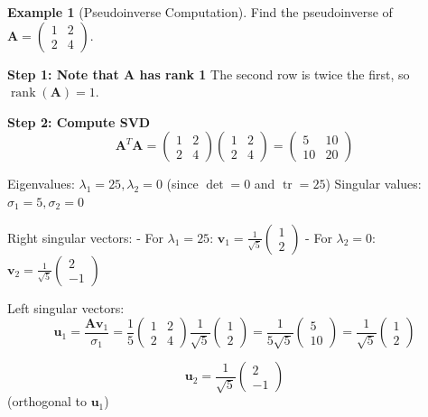 \documentclass[12pt]{article}
\numberwithin{equation}{section}
\newcommand{\vect}[1]{\boldsymbol{#1}}   %
\newcommand{\mat}[1]{\mathbf{#1}}        %
\newcommand{\rank}{\operatorname{rank}}
\newcommand{\tr}{\operatorname{tr}}
\theoremstyle{plain}
\theoremstyle{definition}
\newtheorem{example}[theorem]{Example}
\theoremstyle{remark}
\begin{document}
\begin{example}[Pseudoinverse Computation]
Find the pseudoinverse of $\mat{A} = \begin{pmatrix} 1 & 2 \\ 2 & 4 \end{pmatrix}$.

\textbf{Step 1: Note that $\mat{A}$ has rank 1}
The second row is twice the first, so $\rank(\mat{A}) = 1$.

\textbf{Step 2: Compute SVD}
$$\mat{A}^T\mat{A} = \begin{pmatrix} 1 & 2 \\ 2 & 4 \end{pmatrix}\begin{pmatrix} 1 & 2 \\ 2 & 4 \end{pmatrix} = \begin{pmatrix} 5 & 10 \\ 10 & 20 \end{pmatrix}$$

Eigenvalues: $\lambda_1 = 25, \lambda_2 = 0$ (since $\det = 0$ and $\tr = 25$)
Singular values: $\sigma_1 = 5, \sigma_2 = 0$

Right singular vectors:
- For $\lambda_1 = 25$: $\vect{v}_1 = \frac{1}{\sqrt{5}}\begin{pmatrix} 1 \\ 2 \end{pmatrix}$
- For $\lambda_2 = 0$: $\vect{v}_2 = \frac{1}{\sqrt{5}}\begin{pmatrix} 2 \\ -1 \end{pmatrix}$

Left singular vectors:
$$\vect{u}_1 = \frac{\mat{A}\vect{v}_1}{\sigma_1} = \frac{1}{5}\begin{pmatrix} 1 & 2 \\ 2 & 4 \end{pmatrix}\frac{1}{\sqrt{5}}\begin{pmatrix} 1 \\ 2 \end{pmatrix} = \frac{1}{5\sqrt{5}}\begin{pmatrix} 5 \\ 10 \end{pmatrix} = \frac{1}{\sqrt{5}}\begin{pmatrix} 1 \\ 2 \end{pmatrix}$$

$$\vect{u}_2 = \frac{1}{\sqrt{5}}\begin{pmatrix} 2 \\ -1 \end{pmatrix}$$ (orthogonal to $\vect{u}_1$)


\end{example}
\end{document}
